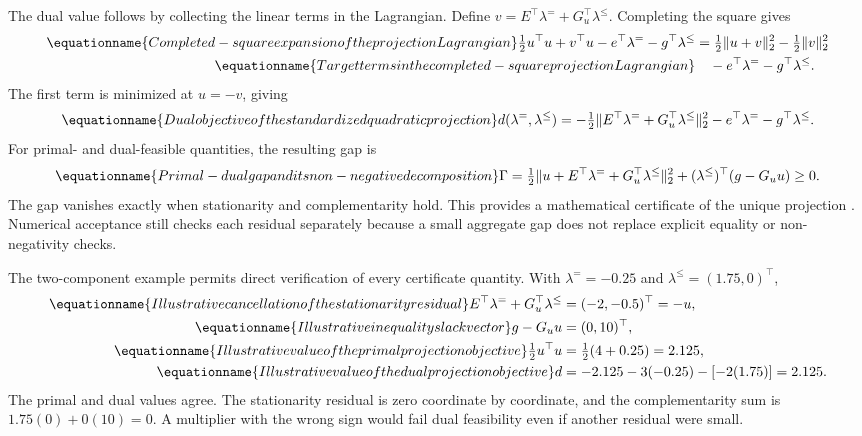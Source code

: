 The dual value follows by collecting the linear terms in the Lagrangian. Define $v=E^\top\lambda^=+G_u^\top\lambda^\le$. Completing the square gives
\begin{align}
\equationname{Completed-square expansion of the projection Lagrangian}
\tfrac12u^\top u+v^\top u-e^\top\lambda^=-g^\top\lambda^\le
&=\tfrac12\|u+v\|_2^2-\tfrac12\|v\|_2^2\\
\equationname{Target terms in the completed-square projection Lagrangian}
&\quad-e^\top\lambda^=-g^\top\lambda^\le.
\end{align}
The first term is minimized at $u=-v$, giving
\begin{equation}
\equationname{Dual objective of the standardized quadratic projection}
d(\lambda^=,\lambda^\le)=
-\tfrac12\|E^\top\lambda^=+G_u^\top\lambda^\le\|_2^2
-e^\top\lambda^=-g^\top\lambda^\le.
\end{equation}
For primal- and dual-feasible quantities, the resulting gap is
\begin{equation}
\equationname{Primal-dual gap and its non-negative decomposition}
\Gamma=\tfrac12\|u+E^\top\lambda^=+G_u^\top\lambda^\le\|_2^2
+(\lambda^\le)^\top(g-G_uu)\ge0.
\label{eq:plant_projection_gap}
\end{equation}
The gap vanishes exactly when stationarity and complementarity hold. This provides a mathematical certificate of the unique projection \citep{Boyd2004}. Numerical acceptance still checks each residual separately because a small aggregate gap does not replace explicit equality or non-negativity checks.

The two-component example permits direct verification of every certificate quantity. With $\lambda^{=}=-0.25$ and $\lambda^\le=(1.75,0)^\top$,
\begin{align}
\equationname{Illustrative cancellation of the stationarity residual}
E^\top\lambda^=+G_u^\top\lambda^\le&=(-2,-0.5)^\top=-u,\\
\equationname{Illustrative inequality slack vector}
g-G_uu&=(0,10)^\top,\\
\equationname{Illustrative value of the primal projection objective}
\tfrac12u^\top u&=\tfrac12(4+0.25)=2.125,\\
\equationname{Illustrative value of the dual projection objective}
d&=-2.125-3(-0.25)-[-2(1.75)]=2.125.
\end{align}
The primal and dual values agree. The stationarity residual is zero coordinate by coordinate, and the complementarity sum is $1.75(0)+0(10)=0$. A multiplier with the wrong sign would fail dual feasibility even if another residual were small.

